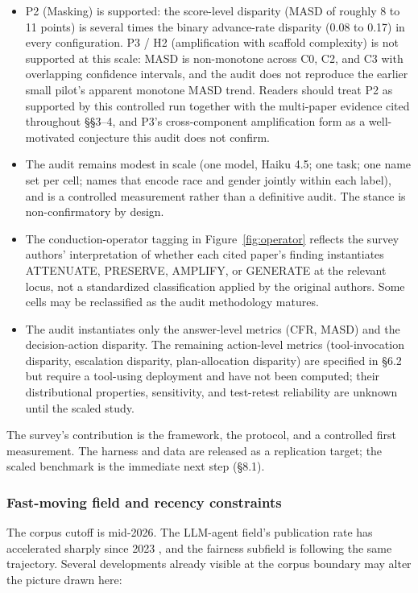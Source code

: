 \documentclass[acmsmall,nonacm]{acmart}
\begin{document}
\begin{itemize}
\item P2 (Masking) is supported: the score-level disparity (MASD of roughly 8 to 11 points) is several times the binary advance-rate disparity (0.08 to 0.17) in every configuration. P3 / H2 (amplification with scaffold complexity) is not supported at this scale: MASD is non-monotone across C0, C2, and C3 with overlapping confidence intervals, and the audit does not reproduce the earlier small pilot's apparent monotone MASD trend. Readers should treat P2 as supported by this controlled run together with the multi-paper evidence cited throughout \S{}\S{}3--4, and P3's cross-component amplification form as a well-motivated conjecture this audit does not confirm.
\item The audit remains modest in scale (one model, Haiku 4.5; one task; one name set per cell; names that encode race and gender jointly within each label), and is a controlled measurement rather than a definitive audit. The stance is non-confirmatory by design.
\item The conduction-operator tagging in Figure~\ref{fig:operator} reflects the survey authors' interpretation of whether each cited paper's finding instantiates ATTENUATE, PRESERVE, AMPLIFY, or GENERATE at the relevant locus, not a standardized classification applied by the original authors. Some cells may be reclassified as the audit methodology matures.
\item The audit instantiates only the answer-level metrics (CFR, MASD) and the decision-action disparity. The remaining action-level metrics (tool-invocation disparity, escalation disparity, plan-allocation disparity) are specified in \S{}6.2 but require a tool-using deployment and have not been computed; their distributional properties, sensitivity, and test-retest reliability are unknown until the scaled study.
\end{itemize}

The survey's contribution is the framework, the protocol, and a controlled first measurement. The harness and data are released as a replication target; the scaled benchmark is the immediate next step (\S{}8.1).

\subsubsection{Fast-moving field and recency constraints}

The corpus cutoff is mid-2026. The LLM-agent field's publication rate has accelerated sharply since 2023 \cite{wang2024survey}, and the fairness subfield is following the same trajectory. Several developments already visible at the corpus boundary may alter the picture drawn here:
\end{document}

